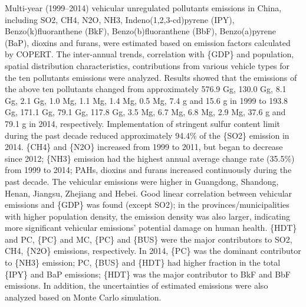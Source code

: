 Multi-year (1999–2014) vehicular unregulated pollutants emissions in China, including SO2, CH4, N2O, NH3, Indeno(1,2,3-cd)pyrene (IPY), Benzo(k)fluoranthene (BkF), Benzo(b)fluoranthene (BbF), Benzo(a)pyrene (BaP), dioxins and furans, were estimated based on emission factors calculated by COPERT. The inter-annual trends, correlation with \{GDP\} and population, spatial distribution characteristics, contributions from various vehicle types for the ten pollutants emissions were analyzed. Results showed that the emissions of the above ten pollutants changed from approximately 576.9 Gg, 130.0 Gg, 8.1 Gg, 2.1 Gg, 1.0 Mg, 1.1 Mg, 1.4 Mg, 0.5 Mg, 7.4 g and 15.6 g in 1999 to 193.8 Gg, 171.1 Gg, 79.1 Gg, 117.8 Gg, 3.5 Mg, 6.7 Mg, 6.8 Mg, 2.9 Mg, 37.6 g and 79.1 g in 2014, respectively. Implementation of stringent sulfur content limit during the past decade reduced approximately 94.4\% of the \{SO2\} emission in 2014. \{CH4\} and \{N2O\} increased from 1999 to 2011, but began to decrease since 2012; \{NH3\} emission had the highest annual average change rate (35.5\%) from 1999 to 2014; PAHs, dioxins and furans increased continuously during the past decade. The vehicular emissions were higher in Guangdong, Shandong, Henan, Jiangsu, Zhejiang and Hebei. Good linear correlation between vehicular emissions and \{GDP\} was found (except SO2); in the provinces/municipalities with higher population density, the emission density was also larger, indicating more significant vehicular emissions' potential damage on human health. \{HDT\} and PC, \{PC\} and MC, \{PC\} and \{BUS\} were the major contributors to SO2, CH4, \{N2O\} emissions, respectively. In 2014, \{PC\} was the dominant contributor to \{NH3\} emission; PC, \{BUS\} and \{HDT\} had higher fraction in the total \{IPY\} and BaP emissions; \{HDT\} was the major contributor to BkF and BbF emissions. In addition, the uncertainties of estimated emissions were also analyzed based on Monte Carlo simulation.